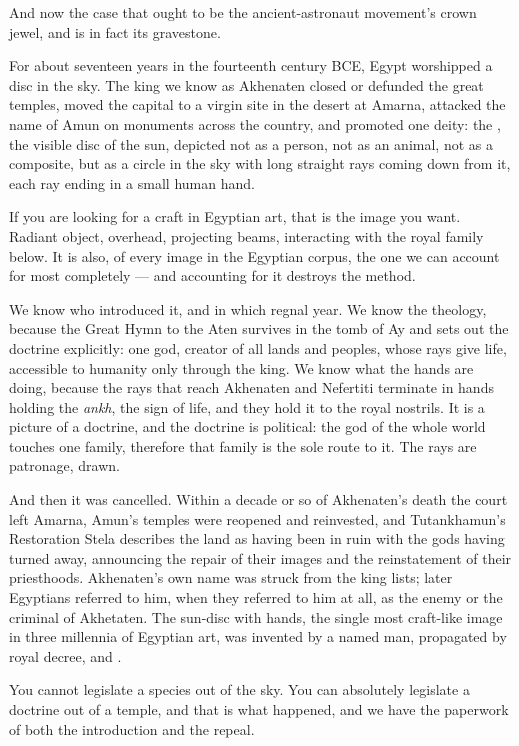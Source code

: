 And now the case that ought to be the ancient-astronaut movement's crown jewel, and is in fact its
gravestone.

For about seventeen years in the fourteenth century BCE, Egypt worshipped a disc in the sky. The
king we know as Akhenaten closed or defunded the great temples, moved the capital to a virgin site
in the desert at Amarna, attacked the name of Amun on monuments across the country, and promoted
one deity: the , the visible disc of the sun, depicted not as a person, not as an animal,
not as a composite, but as a circle in the sky with long straight rays coming down from it, each
ray ending in a small human hand.

If you are looking for a craft in Egyptian art, that is the image you want. Radiant object,
overhead, projecting beams, interacting with the royal family below. It is also, of every image in
the Egyptian corpus, the one we can account for most completely --- and accounting for it destroys
the method.

We know who introduced it, and in which regnal year. We know the theology, because the Great Hymn
to the Aten survives in the tomb of Ay and sets out the doctrine explicitly: one god, creator of
all lands and peoples, whose rays give life, accessible to humanity only through the king. We know
what the hands are doing, because the rays that reach Akhenaten and Nefertiti terminate in hands
holding the \emph{ankh}, the sign of life, and they hold it to the royal nostrils. It is a
picture of a doctrine, and the doctrine is political: the god of the whole world touches one
family, therefore that family is the sole route to it. The rays are patronage, drawn.

And then it was cancelled. Within a decade or so of Akhenaten's death the court left Amarna,
Amun's temples were reopened and reinvested, and Tutankhamun's Restoration Stela describes the
land as having been in ruin with the gods having turned away, announcing the repair of their
images and the reinstatement of their priesthoods. Akhenaten's own name was struck from the king
lists; later Egyptians referred to him, when they referred to him at all, as the enemy or the
criminal of Akhetaten. The sun-disc with hands, the single most craft-like image in three
millennia of Egyptian art, was invented by a named man, propagated by royal decree, and
.

You cannot legislate a species out of the sky. You can absolutely legislate a doctrine out of a
temple, and that is what happened, and we have the paperwork of both the introduction and the
repeal.

